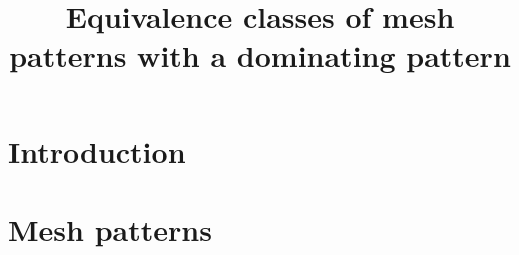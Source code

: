 \documentclass[11pt, a4paper]{amsart}
\title{Equivalence classes of mesh patterns with a dominating pattern}
\begin{document}

\maketitle
\thispagestyle{empty}
\section{Introduction}

\section{Mesh patterns}

\printbibliography
\end{document}
